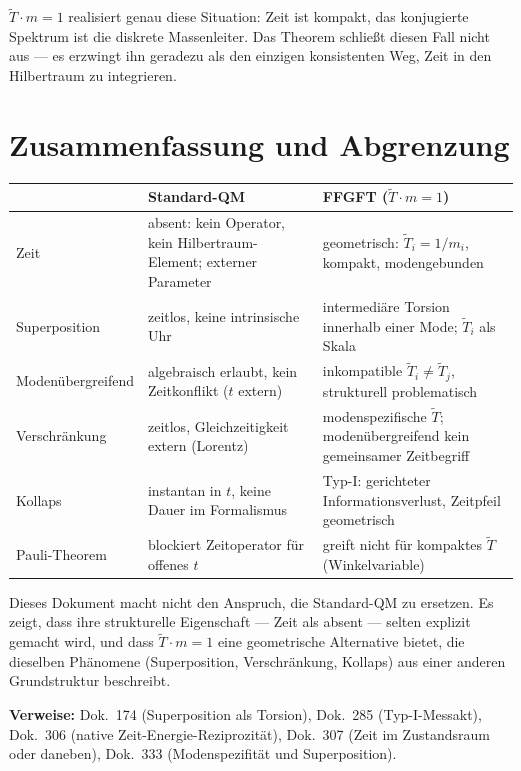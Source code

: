 $\tilde{T}\cdot m = 1$ realisiert genau diese Situation:
Zeit ist kompakt, das konjugierte Spektrum ist die diskrete
Massenleiter. Das Theorem schließt diesen Fall nicht aus —
es erzwingt ihn geradezu als den einzigen konsistenten Weg,
Zeit in den Hilbertraum zu integrieren.

\section{Zusammenfassung und Abgrenzung}

\begin{center}
\begin{tabular}{p{3.5cm}p{4.5cm}p{4.5cm}}
\toprule
 & \textbf{Standard-QM} & \textbf{FFGFT ($\tilde{T}\cdot m=1$)} \\
\midrule
Zeit & absent: kein Operator, kein Hilbertraum-Element; externer
  Parameter & geometrisch: $\tilde{T}_i=1/m_i$, kompakt, modengebunden \\
Superposition & zeitlos, keine intrinsische Uhr & intermediäre
  Torsion innerhalb einer Mode; $\tilde{T}_i$ als Skala \\
Modenübergreifend & algebraisch erlaubt, kein Zeitkonflikt
  ($t$ extern) & inkompatible $\tilde{T}_i \neq \tilde{T}_j$,
  strukturell problematisch \\
Verschränkung & zeitlos, Gleichzeitigkeit extern (Lorentz) &
  modenspezifische $\tilde{T}$; modenübergreifend kein
  gemeinsamer Zeitbegriff \\
Kollaps & instantan in $t$, keine Dauer im Formalismus & Typ-I:
  gerichteter Informationsverlust, Zeitpfeil geometrisch \\
Pauli-Theorem & blockiert Zeitoperator für offenes $t$ &
  greift nicht für kompaktes $\tilde{T}$ (Winkelvariable) \\
\bottomrule
\end{tabular}
\end{center}

\medskip\noindent
Dieses Dokument macht nicht den Anspruch, die Standard-QM zu
ersetzen. Es zeigt, dass ihre strukturelle Eigenschaft —
Zeit als absent — selten explizit gemacht wird, und dass
$\tilde{T}\cdot m=1$ eine geometrische Alternative bietet,
die dieselben Phänomene (Superposition, Verschränkung,
Kollaps) aus einer anderen Grundstruktur beschreibt.

\medskip\noindent
\textbf{Verweise:} Dok.~174 (Superposition als Torsion),
Dok.~285 (Typ-I-Messakt), Dok.~306 (native Zeit-Energie-Reziprozität),
Dok.~307 (Zeit im Zustandsraum oder daneben),
Dok.~333 (Modenspezifität und Superposition).
